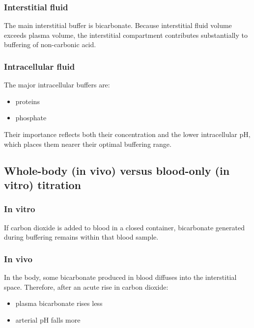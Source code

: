 \documentclass[11pt,a4paper]{article}
\begin{document}
\subsubsection{Interstitial fluid}

The main interstitial buffer is bicarbonate. Because interstitial fluid volume exceeds plasma volume, the interstitial compartment contributes substantially to buffering of non-carbonic acid.

\subsubsection{Intracellular fluid}

The major intracellular buffers are:

\begin{itemize}
    \item proteins
    \item phosphate
\end{itemize}

Their importance reflects both their concentration and the lower intracellular pH, which places them nearer their optimal buffering range.

\subsection{Whole-body (in vivo) versus blood-only (in vitro) titration}

\subsubsection{In vitro}

If carbon dioxide is added to blood in a closed container, bicarbonate generated during buffering remains within that blood sample.

\subsubsection{In vivo}

In the body, some bicarbonate produced in blood diffuses into the interstitial space. Therefore, after an acute rise in carbon dioxide:

\begin{itemize}
    \item plasma bicarbonate rises less
    \item arterial pH falls more
\end{itemize}
\end{document}
